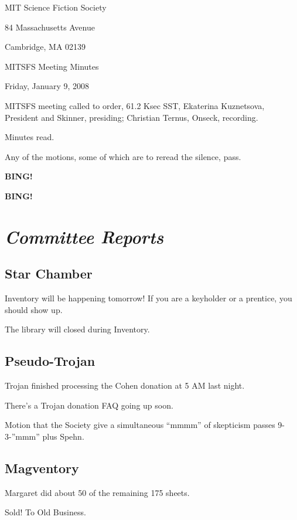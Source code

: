 \documentclass[10pt]{article}
\newcommand{\bing}{{\bf BING!} }
\newcommand{\goto}[1]{\bing \vskip 12pt \section*{{\em{#1}}}}
\newcommand{\ps}{ plus Spehn\xspace}
\begin{document}
\begin{center}

MIT Science Fiction Society

84 Massachusetts Avenue

Cambridge, MA 02139

\vspace{12pt}

MITSFS Meeting Minutes

Friday, January 9, 2008

\end{center}

\vspace{18pt}

\setlength{\parskip}{6pt}

\noindent
MITSFS meeting called to order, 61.2 Ksec SST,
Ekaterina Kuznetsova, President and Skinner, presiding; Christian Ternus, Onseck, recording.

Minutes read.

Any of the motions, some of which are to reread the silence, pass.

\bing

\goto{Committee Reports}

\subsection*{Star Chamber}

Inventory will be happening tomorrow!  If you are a keyholder or a
prentice, you should show up.

The library will closed during Inventory.

\subsection*{Pseudo-Trojan}

Trojan finished processing the Cohen donation at 5 AM last night.

There's a Trojan donation FAQ going up soon.

Motion that the Society give a simultaneous ``mmmm'' of skepticism passes 9-3-''mmm'' \ps.

\subsection*{Magventory}

Margaret did about 50 of the remaining 175 sheets.

Sold!  To Old Business.
\end{document}
